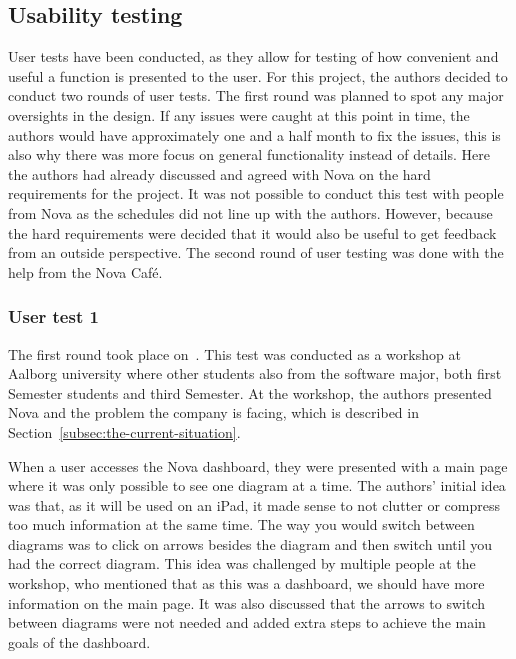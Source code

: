 \subsection{Usability testing}\label{subsec:usability-tests}

User tests have been conducted, as they allow for testing of how convenient
and useful a function is presented to the user.
For this project, the authors decided to conduct two rounds of user tests.
The first round was planned to spot any major oversights in the design.
If any issues were caught at this point in time, the authors would have approximately one and a half month
to fix the issues, this is also why there was more focus on general functionality instead of details.
Here the authors had already discussed and agreed with Nova on the hard requirements for the project.
It was not possible to conduct this test with people from Nova as the schedules did not line up with the authors.
However, because the hard requirements were decided that it would also be useful to get feedback
from an outside perspective.
The second round of user testing was done with the help from the Nova Café.

\subsubsection{User test 1}\label{subsubsec:user-test-1}

The first round took place on~.
This test was conducted as a workshop at Aalborg university where other students also from the software major,
both first Semester students and third Semester.
At the workshop, the authors presented Nova and the problem the company is facing, which is described in
Section~\ref{subsec:the-current-situation}.

When a user accesses the Nova dashboard, they were presented with a main page where it was only possible to see
one diagram at a time.
The authors' initial idea was that, as it will be used on an iPad, it made sense to not clutter or compress too
much information at the same time.
The way you would switch between diagrams was to click on arrows besides the diagram and then switch until you had
the correct diagram.
This idea was challenged by multiple people at the workshop, who mentioned that as this was a dashboard, we should
have more information on the main page.
It was also discussed that the arrows to switch between diagrams were not needed and added extra steps to achieve
the main goals of the dashboard.

